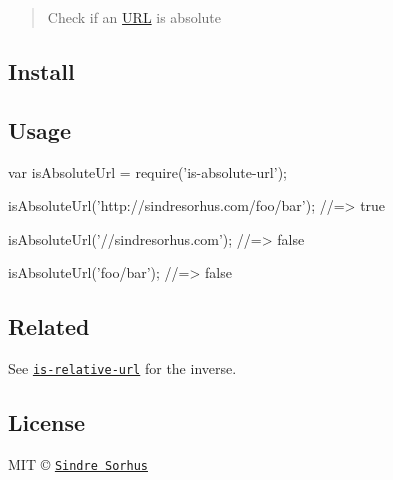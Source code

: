 \begin{quote}
Check if an \mbox{\hyperlink{namespace_u_r_l}{U\+RL}} is absolute \end{quote}


\subsection*{Install}




\subsection*{Usage}


\begin{DoxyCode}
var isAbsoluteUrl = require('is-absolute-url');

isAbsoluteUrl('http://sindresorhus.com/foo/bar');
//=> true

isAbsoluteUrl('//sindresorhus.com');
//=> false

isAbsoluteUrl('foo/bar');
//=> false
\end{DoxyCode}


\subsection*{Related}

See \href{https://github.com/sindresorhus/is-relative-url}{\tt is-\/relative-\/url} for the inverse.

\subsection*{License}

M\+IT © \href{http://sindresorhus.com}{\tt Sindre Sorhus} 